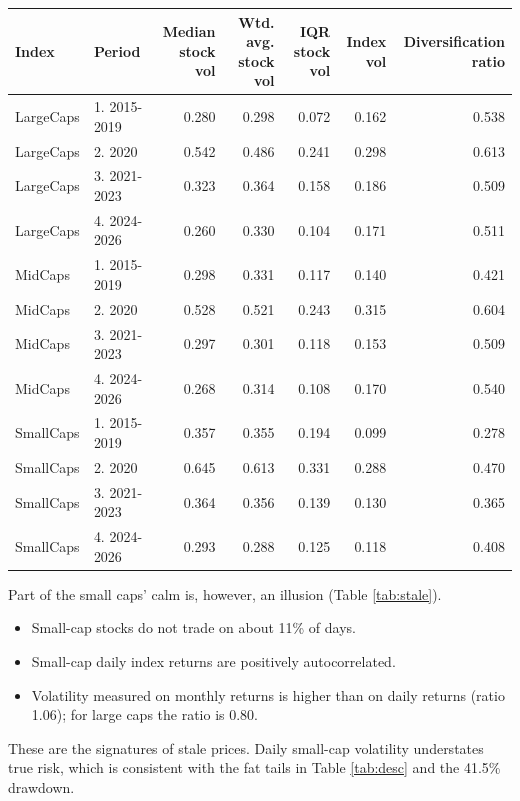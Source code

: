 \documentclass[11pt,preprint]{elsarticle}
\let\origtable\table
\let\endorigtable\endtable
\renewenvironment{table}[1][2] {
    \expandafter\origtable\expandafter[H]
} {
    \endorigtable
}
\numberwithin{equation}{section}
\numberwithin{figure}{section}
\numberwithin{table}{section}
\def\tightlist{} %
\begin{document}
\begin{table}[!htbp]
\centering
\caption{Constituent versus index realised volatility} 
\label{tab:const}
\begingroup\scriptsize
\begin{tabular}{llrrrrr}
  \hline
Index & Period & Median stock vol & Wtd. avg. stock vol & IQR stock vol & Index vol & Diversification ratio \\ 
  \hline
LargeCaps & 1. 2015-2019 & 0.280 & 0.298 & 0.072 & 0.162 & 0.538 \\ 
  LargeCaps & 2. 2020 & 0.542 & 0.486 & 0.241 & 0.298 & 0.613 \\ 
  LargeCaps & 3. 2021-2023 & 0.323 & 0.364 & 0.158 & 0.186 & 0.509 \\ 
  LargeCaps & 4. 2024-2026 & 0.260 & 0.330 & 0.104 & 0.171 & 0.511 \\ 
  MidCaps & 1. 2015-2019 & 0.298 & 0.331 & 0.117 & 0.140 & 0.421 \\ 
  MidCaps & 2. 2020 & 0.528 & 0.521 & 0.243 & 0.315 & 0.604 \\ 
  MidCaps & 3. 2021-2023 & 0.297 & 0.301 & 0.118 & 0.153 & 0.509 \\ 
  MidCaps & 4. 2024-2026 & 0.268 & 0.314 & 0.108 & 0.170 & 0.540 \\ 
  SmallCaps & 1. 2015-2019 & 0.357 & 0.355 & 0.194 & 0.099 & 0.278 \\ 
  SmallCaps & 2. 2020 & 0.645 & 0.613 & 0.331 & 0.288 & 0.470 \\ 
  SmallCaps & 3. 2021-2023 & 0.364 & 0.356 & 0.139 & 0.130 & 0.365 \\ 
  SmallCaps & 4. 2024-2026 & 0.293 & 0.288 & 0.125 & 0.118 & 0.408 \\ 
   \hline
\end{tabular}
\endgroup
\end{table}

Part of the small caps' calm is, however, an illusion (Table
\ref{tab:stale}).

\begin{itemize}
\tightlist
\item
  Small-cap stocks do not trade on about 11\% of days.
\item
  Small-cap daily index returns are positively autocorrelated.
\item
  Volatility measured on monthly returns is higher than on daily returns
  (ratio 1.06); for large caps the ratio is 0.80.
\end{itemize}

These are the signatures of stale prices. Daily small-cap volatility
understates true risk, which is consistent with the fat tails in Table
\ref{tab:desc} and the 41.5\% drawdown.
\end{document}
